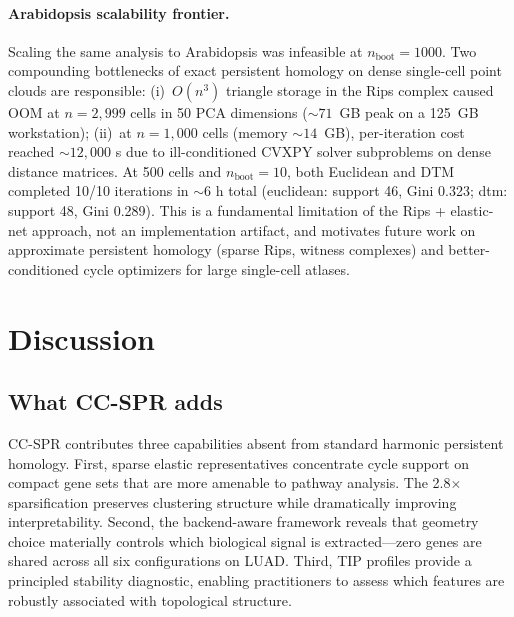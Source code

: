 \documentclass[12pt]{article}
\begin{document}
\paragraph{Arabidopsis scalability frontier.}
Scaling the same analysis to Arabidopsis was infeasible at $n_{\text{boot}} = 1000$.
Two compounding bottlenecks of exact persistent homology on dense single-cell point clouds are responsible:
(i)~$O(n^3)$ triangle storage in the Rips complex caused OOM at $n = 2{,}999$ cells in 50 PCA dimensions ($\sim 71$~GB peak on a 125~GB workstation);
(ii)~at $n = 1{,}000$ cells (memory $\sim 14$~GB), per-iteration cost reached $\sim 12{,}000$ s due to ill-conditioned CVXPY solver subproblems on dense distance matrices.
At 500 cells and $n_{\text{boot}} = 10$, both Euclidean and DTM completed 10/10 iterations in $\sim 6$ h total (euclidean: support 46, Gini 0.323; dtm: support 48, Gini 0.289).
This is a fundamental limitation of the Rips + elastic-net approach, not an implementation artifact, and motivates future work on approximate persistent homology (sparse Rips, witness complexes) and better-conditioned cycle optimizers for large single-cell atlases.


\section{Discussion}
\label{sec:discussion}

\subsection{What CC-SPR adds}

CC-SPR contributes three capabilities absent from standard harmonic persistent homology.
First, sparse elastic representatives concentrate cycle support on compact gene sets that are more amenable to pathway analysis.
The 2.8$\times$ sparsification preserves clustering structure while dramatically improving interpretability.
Second, the backend-aware framework reveals that geometry choice materially controls which biological signal is extracted---zero genes are shared across all six configurations on LUAD.
Third, TIP profiles provide a principled stability diagnostic, enabling practitioners to assess which features are robustly associated with topological structure.
\end{document}
